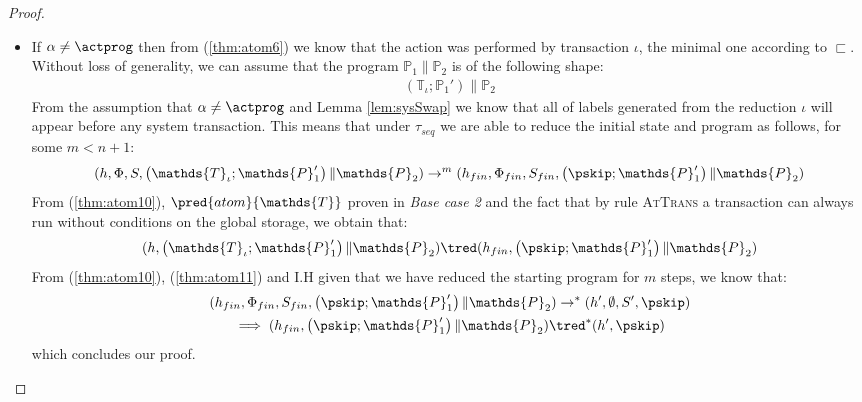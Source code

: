 {\begin{proof}
\begin{itemize}
	\item If $\alpha \neq \actprog$ then from (\ref{thm:atom6}) we know that the action was performed by transaction $\iota$, the minimal one according to $\sqsubset$. Without loss of generality, we can assume that the program $\mathds{P}_1 \| \mathds{P}_2$ is of the following shape:
	\begin{gather}
		\left( \mathds{T}_\iota ; \mathds{P}_1' \right) \| \mathds{P}_2
	\end{gather}
	From the assumption that $\alpha \neq \actprog$ and Lemma \ref{lem:sysSwap} we know that all of labels generated from the reduction $\iota$ will appear before any system transaction. This means that under $\tau_{seq}$ we are able to reduce the initial state and program as follows, for some $m < n + 1$:
	\begin{gather}
		\label{thm:atom10}
		(h, \Phi, S, \left( \mathds{T}_\iota ; \mathds{P}_1' \right) \| \mathds{P}_2) \rightarrow^{m} (h_{fin}, \Phi_{fin}, S_{fin}, \left( \pskip ; \mathds{P}_1' \right) \| \mathds{P}_2)
	\end{gather}
	From (\ref{thm:atom10}), $\pred{atom}{\mathds{T}}$ proven in \textit{Base case 2} and the fact that by rule \textsc{AtTrans} a transaction can always run without conditions on the global storage, we obtain that:
	\begin{gather}
		\label{thm:atom11}
		(h, \left( \mathds{T}_\iota ; \mathds{P}_1' \right) \| \mathds{P}_2) \tred (h_{fin}, \left( \pskip ; \mathds{P}_1' \right) \| \mathds{P}_2)
	\end{gather}
	From (\ref{thm:atom10}), (\ref{thm:atom11}) and I.H given that we have reduced the starting program for $m$ steps, we know that:
	\begin{gather}
		(h_{fin}, \Phi_{fin}, S_{fin}, \left( \pskip ; \mathds{P}_1' \right) \| \mathds{P}_2) \rightarrow^* (h', \emptyset, S', \pskip) \\
		\implies (h_{fin}, \left( \pskip ; \mathds{P}_1' \right) \| \mathds{P}_2) \tred^* (h', \pskip)
	\end{gather}
	which concludes our proof.
\end{itemize}
\end{proof}
}

